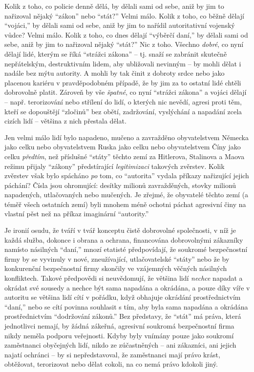 \documentclass{book}
\begin{document}
Kolik z toho, co policie denně dělá, by dělali sami od sebe, aniž by jim to nařizoval nějaký \enquote{zákon} nebo \enquote{stát?} Velmi málo. Kolik z toho, co běžně dělají \enquote{vojáci,} by dělali sami od sebe, aniž by jim to nařídil autoritativní vojenský vůdce? Velmi málo. Kolik z toho, co dnes dělají \enquote{výběrčí daní,} by dělali sami od sebe, aniž by jim to nařizoval nějaký \enquote{stát?} Nic z toho. Všechno \emph{dobré}, co nyní dělají lidé, kterým se říká \enquote{strážci zákona} -- tj. snaží se zabránit skutečně nepřátelským, destruktivním lidem, aby ubližovali nevinným -- by mohli dělat i nadále bez mýtu autority. A mohli by tak činit z dobroty srdce nebo jako placenou kariéru v pravděpodobném případě, že by jim za to ostatní lidé chtěli dobrovolně platit. Zároveň by vše \emph{špatné}, co nyní \enquote{strážci zákona} a vojáci dělají -- např. terorizování nebo střílení do lidí, o kterých nic nevědí, agresi proti těm, kteří se dopouštějí \enquote{zločinů} bez obětí, zadržování, vyslýchání a napadání zcela cizích lidí -- většina z nich přestala dělat.

Jen velmi málo lidí bylo napadeno, mučeno a zavražděno obyvatelstvem Německa jako celku nebo obyvatelstvem Ruska jako celku nebo obyvatelstvem Číny jako celku \emph{předtím}, než příslušné \enquote{státy} těchto zemí za Hitlerova, Stalinova a Maova režimu přijaly \enquote{zákony} předstírající \emph{legitimizaci} takových zvěrstev. Kolik zvěrstev však bylo spácháno \emph{po} tom, co \enquote{autorita} vydala příkazy nařizující jejich páchání? Čísla jsou ohromující: desítky milionů zavražděných, stovky milionů napadených, utlačovaných nebo mučených. Je zřejmé, že obyvatelé těchto zemí (a téměř všech ostatních zemí) byli mnohem méně ochotni páchat agresivní činy na vlastní pěst než na příkaz imaginární \enquote{autority.}

Je ironií osudu, že tváří v tvář konceptu čistě dobrovolné společnosti, v níž je každá služba, dokonce i obrana a ochrana, financována dobrovolnými zákazníky namísto násilných \enquote{daní,} mnozí etatisté předpovídají, že soukromé bezpečnostní firmy by se vyvinuly v nové, zneužívající, utlačovatelské \enquote{státy} nebo že by konkurenční bezpečnostní firmy skončily ve vzájemných věčných násilných konfliktech. Takové předpovědi si neuvědomují, že většina lidí \emph{nechce} napadat a okrádat své sousedy a nechce být sama napadána a okrádána, a pouze díky víře v autoritu se většina lidí cítí v pořádku, když obhajuje okrádání prostřednictvím \enquote{daní,} nebo se cítí povinna souhlasit s tím, aby byla sama napadána a okrádána prostřednictvím \enquote{dodržování zákonů.} Bez představy, že \enquote{stát} má práva, která jednotlivci nemají, by žádná zákeřná, agresivní soukromá bezpečnostní firma nikdy neměla podporu veřejnosti. Kdyby byly vnímány pouze jako soukromí zaměstnanci obyčejných lidí, nikdo ze zúčastněných -- ani zákazníci, ani jejich najatí ochránci -- by si nepředstavoval, že zaměstnanci mají právo krást, obtěžovat, terorizovat nebo dělat cokoli, na co nemá právo kdokoli jiný.
\end{document}
